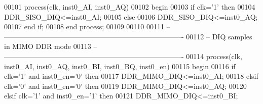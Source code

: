 \begin{DoxyCode}
00101 \textcolor{keywordflow}{process}(clk, inst0_AI, inst0_AQ) 
00102 \textcolor{vhdlkeyword}{    begin }
00103     \textcolor{keywordflow}{if} \textcolor{vhdlchar}{clk}\textcolor{vhdlchar}{=}\textcolor{vhdlchar}{'}\textcolor{vhdllogic}{}\textcolor{vhdllogic}{1}\textcolor{vhdlchar}{'} \textcolor{keywordflow}{then} 
00104         \textcolor{vhdlchar}{DDR_SISO_DIQ}\textcolor{vhdlchar}{<=}\textcolor{vhdlchar}{inst0_AI};
00105     \textcolor{keywordflow}{else} 
00106         \textcolor{vhdlchar}{DDR_SISO_DIQ}\textcolor{vhdlchar}{<=}\textcolor{vhdlchar}{inst0_AQ};
00107     \textcolor{keywordflow}{end} \textcolor{keywordflow}{if};
00108 \textcolor{keywordflow}{end} \textcolor{keywordflow}{process};
00109 
00110 
00111 \textcolor{keyword}{-- ----------------------------------------------------------------------------}
00112 \textcolor{keyword}{-- DIQ samples in MIMO DDR mode}
00113 \textcolor{keyword}{-- ----------------------------------------------------------------------------}
00114 \textcolor{keywordflow}{process}(clk, inst0_AI, inst0_AQ, inst0_BI, inst0_BQ, inst0_en) 
00115 \textcolor{vhdlkeyword}{    begin }
00116     \textcolor{keywordflow}{if} \textcolor{vhdlchar}{clk}\textcolor{vhdlchar}{=}\textcolor{vhdlchar}{'}\textcolor{vhdllogic}{}\textcolor{vhdllogic}{1}\textcolor{vhdlchar}{'} \textcolor{keywordflow}{and} \textcolor{vhdlchar}{inst0_en}\textcolor{vhdlchar}{=}\textcolor{vhdlchar}{'}\textcolor{vhdllogic}{}\textcolor{vhdllogic}{0}\textcolor{vhdlchar}{'} \textcolor{keywordflow}{then} 
00117         \textcolor{vhdlchar}{DDR_MIMO_DIQ}\textcolor{vhdlchar}{<=}\textcolor{vhdlchar}{inst0_AI};
00118     \textcolor{keywordflow}{elsif} \textcolor{vhdlchar}{clk}\textcolor{vhdlchar}{=}\textcolor{vhdlchar}{'}\textcolor{vhdllogic}{}\textcolor{vhdllogic}{0}\textcolor{vhdlchar}{'} \textcolor{keywordflow}{and} \textcolor{vhdlchar}{inst0_en}\textcolor{vhdlchar}{=}\textcolor{vhdlchar}{'}\textcolor{vhdllogic}{}\textcolor{vhdllogic}{0}\textcolor{vhdlchar}{'} \textcolor{keywordflow}{then} 
00119         \textcolor{vhdlchar}{DDR_MIMO_DIQ}\textcolor{vhdlchar}{<=}\textcolor{vhdlchar}{inst0_AQ};
00120     \textcolor{keywordflow}{elsif} \textcolor{vhdlchar}{clk}\textcolor{vhdlchar}{=}\textcolor{vhdlchar}{'}\textcolor{vhdllogic}{}\textcolor{vhdllogic}{1}\textcolor{vhdlchar}{'} \textcolor{keywordflow}{and} \textcolor{vhdlchar}{inst0_en}\textcolor{vhdlchar}{=}\textcolor{vhdlchar}{'}\textcolor{vhdllogic}{}\textcolor{vhdllogic}{1}\textcolor{vhdlchar}{'} \textcolor{keywordflow}{then} 
00121         \textcolor{vhdlchar}{DDR_MIMO_DIQ}\textcolor{vhdlchar}{<=}\textcolor{vhdlchar}{inst0_BI};

\end{DoxyCode}

